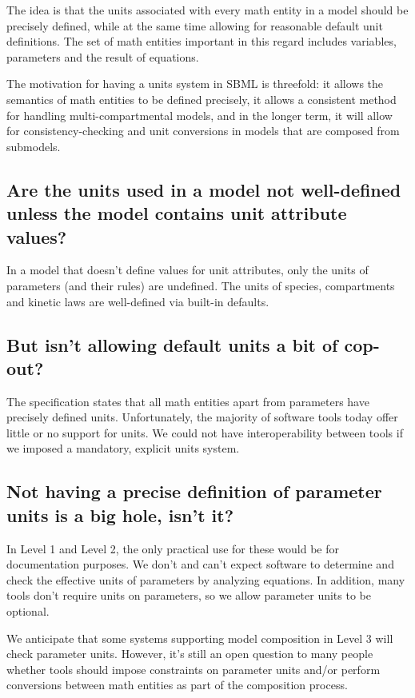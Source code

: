 \documentclass{sbmlfaq}
\begin{document}
The idea is that the units associated with every math entity in a model
should be precisely defined, while at the same time allowing for reasonable
default unit definitions.  The set of math entities important in this
regard includes variables, parameters and the result of equations.

The motivation for having a units system in SBML is threefold: it allows
the semantics of math entities to be defined precisely, it allows a
consistent method for handling multi-compartmental models, and in the
longer term, it will allow for consistency-checking and unit conversions in
models that are composed from submodels.


\subsection{Are the units used in a model not well-defined unless the model contains unit attribute values?}

In a model that doesn't define values for unit attributes, only the units of
parameters (and their rules) are undefined.  The units of species,
compartments and kinetic laws are well-defined via built-in defaults.


\subsection{But isn't allowing default units a bit of cop-out?}

The specification states that all math entities apart from parameters have
precisely defined units.  Unfortunately, the majority of software tools
today offer little or no support for units.  We could not have
interoperability between tools if we imposed a mandatory, explicit units
system.


\subsection{Not having a precise definition of parameter units is a big hole, isn't it?}

In Level 1 and Level 2, the only practical use for these would be for documentation purposes.
We don't and can't expect software to determine and check the effective units of parameters by analyzing
equations.  In addition, many tools don't require units on parameters, so we allow parameter
units to be optional.

We anticipate that some systems supporting model composition in Level 3 will check parameter units.
However, it's still an
open question to many people whether tools should impose constraints
on parameter units and/or perform conversions between math entities
as part of the composition process.
\end{document}
